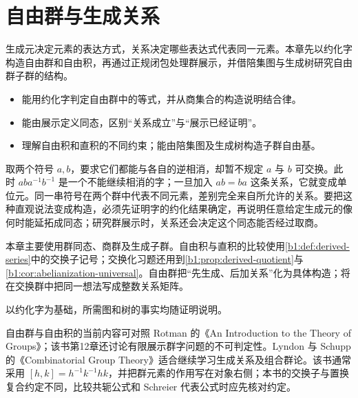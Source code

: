 
\chapter{自由群与生成关系}
\label{b1:ch:08}

\begin{chapterabstract}
	生成元决定元素的表达方式，关系决定哪些表达式代表同一元素。本章先以约化字构造自由群和自由积，再通过正规闭包处理群展示，并借陪集图与生成树研究自由群子群的结构。
\end{chapterabstract}

\begin{learninggoals}
	\begin{itemize}
		\item 能用约化字判定自由群中的等式，并从商集合的构造说明结合律。
		\item 能由展示定义同态，区别“关系成立”与“展示已经证明”。
		\item 理解自由积和直积的不同约束；能由陪集图及生成树构造子群自由基。
	\end{itemize}
\end{learninggoals}

取两个符号 \(a,b\)，要求它们都能与各自的逆相消，却暂不规定 \(a\) 与 \(b\) 可交换。此时 \(aba^{-1}b^{-1}\) 是一个不能继续相消的字；一旦加入 \(ab=ba\) 这条关系，它就变成单位元。同一串符号在两个群中代表不同元素，差别完全来自所允许的关系。要把这种直观说法变成构造，必须先证明字的约化结果确定，再说明任意给定生成元的像何时能延拓成同态；研究群展示时，关系还会决定这个同态能否经过取商。

\ProseParagraphBreak

本章主要使用群同态、商群及生成子群。自由积与直积的比较使用\cref{b1:def:derived-series}中的交换子记号；交换化习题还用到\cref{b1:prop:derived-quotient}与\cref{b1:cor:abelianization-universal}。自由群把“先生成、后加关系”化为具体构造；将在交换群中把同一想法写成整数关系矩阵。

\ProseParagraphBreak
{}以约化字为基础，所需图和树的事实均随证明说明。

\ProseParagraphBreak
自由群与自由积的当前内容可对照 Rotman 的《An Introduction to the Theory of Groups》\cite[Chapter 11]{Rotman1995TheoryGroups}；该书第12章还讨论有限展示群字问题的不可判定性。Lyndon 与 Schupp 的《Combinatorial Group Theory》\cite[Chapter I, \S\S~1--3; Chapter II, \S\S~1--2]{LyndonSchupp2001}适合继续学习生成关系及组合群论。该书通常采用 \([h,k]=h^{-1}k^{-1}hk\)，并把群元素的作用写在对象右侧；本书的交换子与置换复合约定不同，比较共轭公式和 Schreier 代表公式时应先核对约定。

